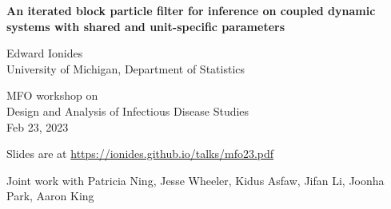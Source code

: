 \documentclass{beamer}
\begin{document}
\begin{frame}
  
\begin{center}
  {\Large\bf An iterated block particle filter for inference on coupled dynamic systems with shared and unit-specific parameters}


\vspace{2mm}

Edward Ionides\\
University of Michigan, Department of Statistics

\vspace{8mm}

MFO workshop on \\
Design and Analysis of Infectious Disease Studies
\\
Feb 23, 2023


\hspace{3mm}

Slides are at \url{https://ionides.github.io/talks/mfo23.pdf}

\vspace{8mm}

Joint work with
Patricia Ning, Jesse Wheeler, Kidus Asfaw, Jifan Li, Joonha Park, Aaron King

\end{center}

\end{frame}
\end{document}
